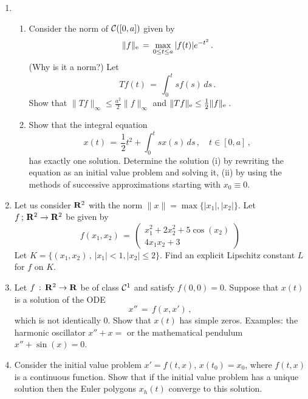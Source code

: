 \documentclass[12pt]{report}
\newcommand{\calC}{{\cal C}}
\newcommand{\bR}{{\bf R}}
\def\to{\rightarrow}
\begin{document}
\begin{enumerate}
\item 
\begin{enumerate}
\item 
Consider the norm of $\calC([0,a])$ given by 
\begin{equation}
\|f\|_{\rm e} \,=\, \max_{0 \le t \le a} |f(t)|e^{-t^2} \,.
\end{equation}
(Why is it a norm?)  
Let 
\begin{equation}
Tf(t) \,=\, \int_0^t s f(s) \,ds  \,.
\end{equation}
Show that $\| T f \|_{\infty} \le \frac{a^2}{2} \|f\|_{\infty}$ and 
$\| T f \|_{\rm e} \le \frac{1}{2} \|f\|_{\rm e}$\,.
\item Show that the integral equation
\begin{equation}
x(t)\,=\, \frac{1}{2}t^2 + \int_0^t s x(s) \, ds \,, \quad t \in [0, a] \,,
\end{equation} 
has exactly one solution. Determine the solution (i) by rewriting the
equation as an initial value problem and solving it, (ii) by using the
methods of successive approximations starting with $x_0\equiv 0$.
\end{enumerate}

\item Let us consider $\bR^2$ with the norm $\|x\| = \max\{ |x_1|, |x_2|\}$.  
Let $f\,;\, \bR^2 \to \bR^2$ be given by 
\begin{equation}
f(x_1,x_2) \,=\, \left( \begin{array}{cc} x_1^2 + 2 x_2^2 + 5\cos(x_2) \\
4x_1x_2 +3 \end{array} \right)
\end{equation}
Let $K = \{ (x_1,x_2) \,,\, |x_1|<1, |x_2| \le 2\}$. Find an explicit Lipschitz
constant $L$ for $f$ on $K$. 


\item Let $f \,:\, \bR^2 \to \bR$ be of class $\calC^1$ and satisfy
$f(0,0)=0$. Suppose that $x(t)$ is a solution of the ODE
\begin{equation}
x''\,=\, f(x,x') \,,
\end{equation}
which is not identically $0$.  Show that $x(t)$ has simple zeros. 
Examples: the harmonic oscillator $x''+x=$ or the mathematical
pendulum $x'' + \sin(x)=0$.



\item Consider the initial value problem $x'=f(t,x)$, $x(t_0)=x_0$, 
where $f(t,x)$ is a continuous function.  Show that if the initial value problem has 
a unique solution  then the Euler polygons $x_h(t)$ converge to this solution. 



\end{enumerate}
\end{document}
